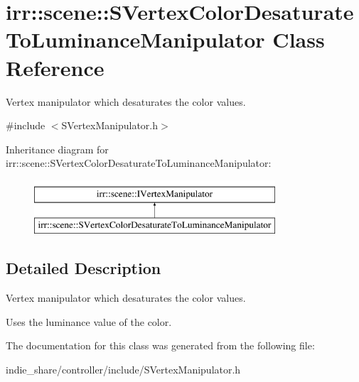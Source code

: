 \hypertarget{classirr_1_1scene_1_1SVertexColorDesaturateToLuminanceManipulator}{}\section{irr\+:\+:scene\+:\+:S\+Vertex\+Color\+Desaturate\+To\+Luminance\+Manipulator Class Reference}
\label{classirr_1_1scene_1_1SVertexColorDesaturateToLuminanceManipulator}


Vertex manipulator which desaturates the color values.  




{\ttfamily \#include $<$S\+Vertex\+Manipulator.\+h$>$}

Inheritance diagram for irr\+:\+:scene\+:\+:S\+Vertex\+Color\+Desaturate\+To\+Luminance\+Manipulator\+:\begin{figure}[H]
\begin{center}
\leavevmode
\includegraphics[height=2.000000cm]{classirr_1_1scene_1_1SVertexColorDesaturateToLuminanceManipulator}
\end{center}
\end{figure}


\subsection{Detailed Description}
Vertex manipulator which desaturates the color values. 

Uses the luminance value of the color. 

The documentation for this class was generated from the following file\+:\begin{DoxyCompactItemize}
\item 
indie\+\_\+share/controller/include/S\+Vertex\+Manipulator.\+h\end{DoxyCompactItemize}
